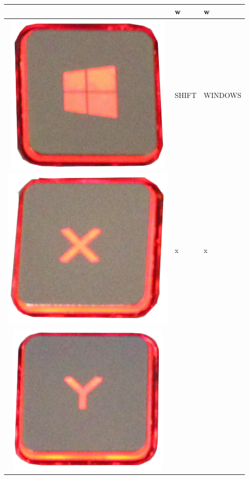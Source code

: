 \begin{longtable}{|cll|}
\begin{minipage}[c]{.3\textwidth}
\vspace{0.2cm}
\end{minipage} & w & w\\
\hline
\begin{minipage}[c]{.3\textwidth}
\vspace{0.2cm}
\includegraphics[scale=0.06]{Images/KeyMapping/WINDOWS}
\vspace{0.2cm}
\end{minipage} & SHIFT & WINDOWS\\
\hline
\begin{minipage}[c]{.3\textwidth}
\vspace{0.2cm}
\includegraphics[scale=0.06]{Images/KeyMapping/x}
\vspace{0.2cm}
\end{minipage} & x & x\\
\hline
\begin{minipage}[c]{.3\textwidth}
\vspace{0.2cm}
\includegraphics[scale=0.06]{Images/KeyMapping/y}

\end{minipage}
\end{longtable}
